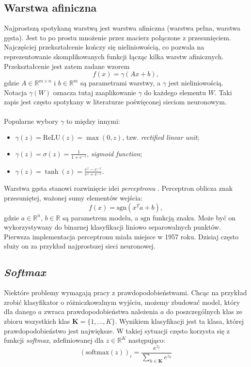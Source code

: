 
\subsection{Warstwa afiniczna}
Najprostszą spotykaną warstwą jest warstwa afiniczna (warstwa pełna, warstwa gęsta). Jest to po prostu mnożenie przez macierz połączone z przesunięciem. Najczęściej przekształcenie kończy się nieliniowością, co pozwala na reprezentowanie skomplikowanych funkcji łącząc kilka warstw afinicznych. Przekształcenie jest zatem zadane wzorem
\[\mathit{f}(x) = \gamma(Ax + b),\]
gdzie $A \in \mathbb{R}^{m \times n}$ i $b \in \mathbb{R}^m$ są parametrami warstwy, a $\gamma$ jest nieliniowością. Notacja $\gamma(W)$ oznacza tutaj zaaplikowanie $\gamma$ do każdego elementu $W$. Taki zapis jest często spotykany w literaturze poświęconej sieciom neuronowym.
\\\\
Popularne wybory $\gamma$ to między innymi:
\begin{itemize}
\item $\gamma(z) = \mathrm{ReLU}(z) = \max(0, z)$, tzw. \textit{rectified linear unit};
\item $\gamma(z) = \sigma(z) = \frac{1}{1 + e^{-z}}$, \textit{sigmoid function};
\item $\gamma(z) = \tanh(z) = \frac{e^z - e^{-z}}{e^z + e^{-z}}$.
\end{itemize}

\vspace{5mm}
Warstwa gęsta stanowi rozwinięcie idei \textit{perceptronu} \cite{perceptron}. Perceptron oblicza znak przesuniętej, ważonej sumy elementów wejścia:
\[f(x) = \mathrm{sgn}(x^Ta + b),\]
gdzie $a \in \mathbb{R}^n$, $b \in \mathbb{R}$ są parametrem modelu, a $\mathrm{sgn}$ funkcją znaku. Może być on wykorzystywany do binarnej klasyfikacji liniowo separowalnych punktów. Pierwsza implementacja perceptronu miała miejsce w 1957 roku. Dzisiaj często służy on za przykład najprostszej sieci neuronowej.


\subsection{\textit{Softmax}}
Niektóre problemy wymagają pracy z prawdopodobieństwami. Chcąc na przykład zrobić klasyfikator o różniczkowalnym wyjściu, możemy zbudować model, który dla danego $a$ zwraca prawdopodobieństwa należenia $a$ do poszczególnych klas ze zbioru wszystkich klas $\mathbf{K} = \{1,\dots,K\}$. Wynikiem klasyfikacji jest ta klasa, której prawdopodobieństwo jest największe. W takiej sytuacji często korzysta się z funkcji \textit{softmax}, zdefiniowanej dla $z \in \mathbb{R}^{K}$ następująco:
\[(\mathrm{softmax}(z))_i = \frac{e^{z_i}}{\sum_{k \in \mathbf{K}} e^{z_k}}\]

